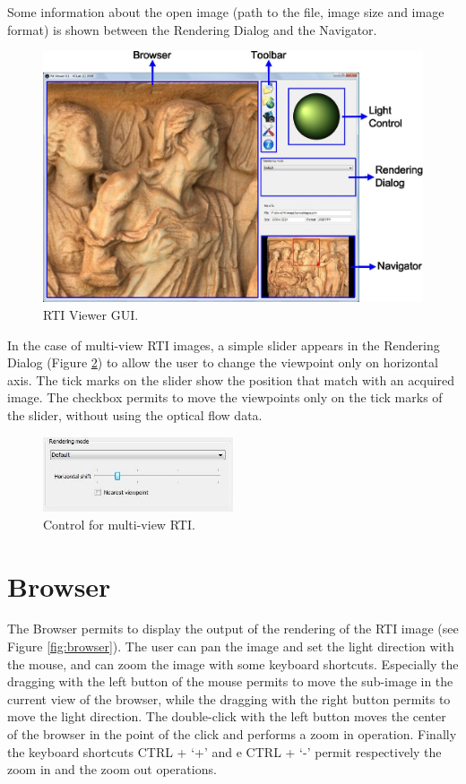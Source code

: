 \documentclass[oneside, 11pt]{book}
\begin{document}
Some information about the open image (path to the file, image size and image format) is shown between the Rendering Dialog and the Navigator.

\begin{figure}[htbp!]
  \centering
  \includegraphics[width=\textwidth]{rtiviewer}
  \caption{RTI Viewer GUI.}
  \label{fig:rtiviewer}
\end{figure}

In the case of multi-view RTI images, a simple slider appears in the Rendering Dialog (Figure \ref{fig:multiview}) to allow the user to change the viewpoint only on horizontal axis. The tick marks on the slider show the position that match with an acquired image. The checkbox permits to move the viewpoints only on the tick marks of the slider, without using the optical flow data.

\begin{figure}[htbp!]
  \centering
  \includegraphics[width=0.5\textwidth]{multiview}
  \caption{Control for multi-view RTI.}
  \label{fig:multiview}
\end{figure}

\section{Browser}
The Browser permits to display the output of the rendering of the RTI image (see Figure \ref{fig:browser}). The user can pan the image and set the light direction with the mouse, and can zoom the image with some keyboard shortcuts. Especially the dragging with the left button of the mouse permits to move the sub-image in the current view of the browser, while the dragging with the right button permits to move the light direction. The double-click with the left button moves the center of the browser in the point of the click and performs a zoom in operation. Finally the keyboard shortcuts CTRL + `+' and e CTRL + `-' permit respectively the zoom in and the zoom out operations.
\end{document}
